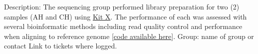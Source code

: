 \markdownRendererUlBegin
\markdownRendererUlItem Description: The sequencing group performed library preparation for two (2) samples (AH and CH) using \href{https://www.sophiagenetics.com/clinical/oncology/solid-tumors/}{Kit X}. The performance of each was assessed with several bioinformatic methods including read quality control and performance when aligning to reference genome [\href{https://github.com/DylanLawless/kit_assess}{code available here}].\markdownRendererUlItemEnd 
\markdownRendererUlItem Group: name of group or contact\markdownRendererUlItemEnd 
\markdownRendererUlItem Link to tickets where logged.\markdownRendererUlItemEnd 
\markdownRendererUlEnd \relax